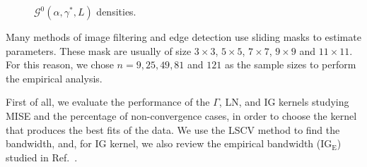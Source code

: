 \documentclass[twocolumn]{svjour3}
\begin{document}
\begin{figure}[hbt]
	\centering
	\caption{$\mathcal{G}^0(\alpha,\gamma^*,L)$ densities.}\label{densidades} 
\end{figure}

Many methods of image filtering and edge detection use sliding masks to estimate parameters. 
These mask are usually of size $3 \times 3$, $5 \times 5$, $7 \times 7$, $9 \times 9$ and $11 \times 11$. 
For this reason, we chose $n=9,25,49,81$ and $121$ as the sample sizes to perform the empirical analysis.

%    
First of all, we evaluate the performance of the $\Gamma$, LN, and IG kernels studying MISE and the percentage of non-convergence cases, in order to choose the kernel that produces the best fits of the data. 
We use the LSCV method to find the bandwidth, and, for IG kernel, we also review the empirical bandwidth ($\text{IG}_{\text{E}}$) studied in Ref.~\cite{gambini2015}. 
\end{document}
